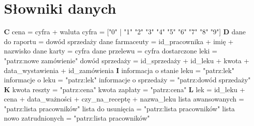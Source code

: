 \documentclass[a4paper, 11pt]{article}
\begin{document}
	\section{Słowniki danych}
	\textbf{C} \newline \newline
	\noindent
	cena = {cyfra} + waluta \newline
	cyfra = ["0" | "1" \textpipe "2" \textpipe "3" \textpipe "4" \textpipe "5" \textpipe "6" \textpipe "7" \textpipe "8" \textpipe "9"] \newline \newline
	\textbf{D} \newline \newline
	\noindent
	dane do raportu = {dowód sprzedaży} \newline
	dane farmaceuty = \at id\_pracownika + imię + nazwisko \newline
	dane karty = {cyfra} \newline
	dane przelewu = {cyfra} \newline
	dostarczone leki = "patrz:nowe zamówienie" \newline
	dowód sprzedaży = \at id\_sprzedaży + id\_leku + kwota + data\_wystawienia + id\_zamówienia \newline \newline
	\textbf{I} \newline \newline
	\noindent
	informacja o stanie leku = "patrz:lek" \newline
	informacje o leku = "patrz:lek" \newline
	informacje o sprzedaży = "patrz:dowód sprzedaży" \newline \newline
	\textbf{K} \newline \newline
	\noindent
	kwota reszty = "patrz:cena" \newline
	kwota zapłaty = "patrz:cena" \newline \newline
	\textbf{L} \newline \newline
	\noindent
	lek = \at id\_leku + cena + data\_ważności + czy\_na\_receptę + nazwa\_leku \newline
	lista awansowanych = "patrz:lista pracowników" \newline
	lista do usunięcia = "patrz:lista pracowników" \newline
	lista nowo zatrudnionych = "patrz:lista pracowników" \newline
\end{document}

